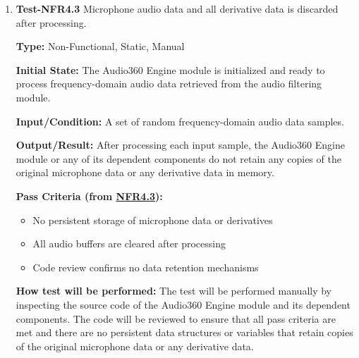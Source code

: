 \documentclass[12pt, titlepage]{article}
\begin{document}
\begin{enumerate}
\textbf{Pass Criteria:}
\begin{itemize}
\item Processing time per frame $<$ 62.5 $\mu$s (1/16,000 seconds)
\item No frame drops over entire test duration
\item 100\% of frames processed within time constraint
\end{itemize}

\textbf{How test will be performed:}
The test will be performed automatically by simulating a continuous stream of
frequency-domain audio data from the audio filtering module. The Audio360 Engine
module will log the processing time for each frame. The logs will be analyzed to
verify that all pass criteria are met. This test will have to be performed on
the microcontroller to ensure accurate timing measurements.

\item{\textbf{Test-NFR4.3} Microphone audio data and all derivative data is
 discarded after processing.\\}

\textbf{Type:} Non-Functional, Static, Manual

\textbf{Initial State:}
The Audio360 Engine module is initialized and ready to process frequency-domain
audio data retrieved from the audio filtering module.

\textbf{Input/Condition:}
A set of random frequency-domain audio data samples.

\textbf{Output/Result:}
After processing each input sample, the Audio360 Engine module or any of its
dependent components do not retain any copies of the original microphone data or
any derivative data in memory.

\textbf{Pass Criteria (from \hyperref[SRS-NFR4_3]{NFR4.3}):}
\begin{itemize}
\item No persistent storage of microphone data or derivatives
\item All audio buffers are cleared after processing
\item Code review confirms no data retention mechanisms
\end{itemize}

\textbf{How test will be performed:}
The test will be performed manually by inspecting the source code of the
Audio360 Engine module and its dependent components. The code will be reviewed
to ensure that all pass criteria are met and there are no persistent data
structures or variables that retain copies of the original microphone data or
any derivative data.

\end{enumerate}
\end{document}
